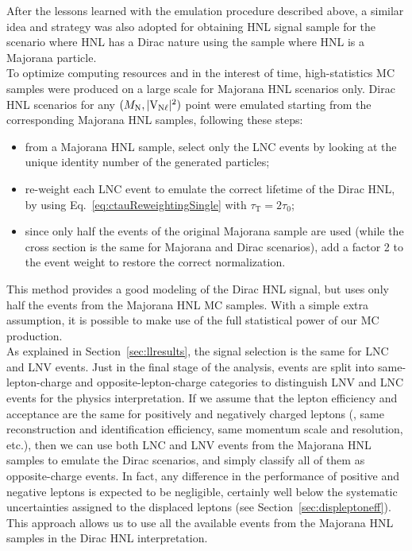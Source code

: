 After the lessons learned with the emulation procedure described 
above, a similar idea and strategy
was also adopted for obtaining HNL signal sample for the scenario where HNL has a Dirac nature using the sample where HNL is a Majorana particle.\\
To optimize computing resources and in the interest of time,
high-statistics MC samples were produced on a large scale for Majorana
HNL scenarios only.
Dirac HNL scenarios for any $(M_{\mathrm{N}},\mathrm{|V_{\mathrm{N}\ell}|^2})$ point were emulated
starting from the corresponding Majorana HNL samples, following these
steps:
\begin{itemize}
\setlength\itemsep{-0.2em}
\item from a Majorana HNL sample, select only the LNC events by
  looking at the unique identity number of the generated particles;
\item re-weight each LNC event to emulate the correct lifetime of the
  Dirac HNL, by using Eq.~\ref{eq:ctauReweightingSingle} with
  $\tau_{\mathrm{T}}=2\tau_0$;
\item since only half the events of the original Majorana sample are
  used (while the cross section is the same for Majorana and Dirac
  scenarios), add a factor 2 to the event weight to restore the correct
  normalization.
\end{itemize}
This method provides a good modeling of the Dirac HNL signal, but
uses only half the events from the Majorana HNL MC samples. With a
simple extra assumption, it is possible to make use of the full
statistical power of our MC production.\\
As explained in Section~\ref{sec:llresults}, the signal selection is the
same for LNC and LNV events. Just in the final stage of the analysis,
events are split into same-lepton-charge and opposite-lepton-charge
categories to distinguish LNV and LNC events for the physics
interpretation. If we assume that the lepton efficiency and
acceptance are the same for positively and negatively charged leptons
(\ie, same reconstruction and identification efficiency, same momentum
scale and resolution, etc.), then we can use both LNC and LNV events
from the Majorana HNL samples to emulate the Dirac scenarios, and
simply classify all of them as opposite-charge events. In fact, any
difference in the performance of positive and negative leptons is
expected to be negligible, certainly well below the systematic
uncertainties assigned to the displaced leptons (see
Section~\ref{sec:displeptoneff}).
This approach allows us to use all the available events from the
Majorana HNL samples in the Dirac HNL interpretation.\\
